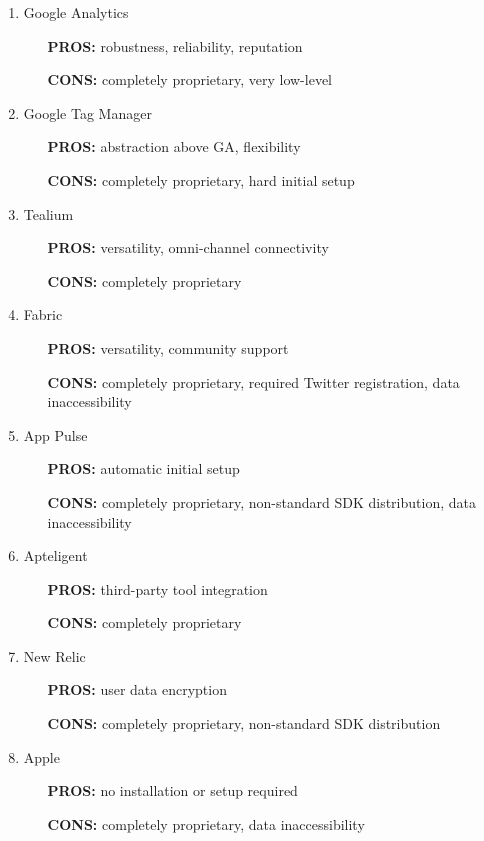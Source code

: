 \begin{enumerate}
	\item Google Analytics
		\begin{itemize}
			\item[{\bf PROS:}] robustness, reliability, reputation
			\item[{\bf CONS:}] completely proprietary, very low-level
		\end{itemize}
	\item Google Tag Manager
		\begin{itemize}
			\item[{\bf PROS:}] abstraction above GA, flexibility
			\item[{\bf CONS:}] completely proprietary, hard initial setup
		\end{itemize}
	\item Tealium
		\begin{itemize}
			\item[{\bf PROS:}] versatility, omni-channel connectivity
			\item[{\bf CONS:}] completely proprietary
		\end{itemize}
	\item Fabric
		\begin{itemize}
			\item[{\bf PROS:}] versatility, community support
			\item[{\bf CONS:}] completely proprietary, required Twitter registration, data inaccessibility
		\end{itemize}
	\item App Pulse
		\begin{itemize}
			\item[{\bf PROS:}] automatic initial setup
			\item[{\bf CONS:}] completely proprietary, non-standard SDK distribution, data inaccessibility
		\end{itemize}
	\item Apteligent
		\begin{itemize}
			\item[{\bf PROS:}] third-party tool integration
			\item[{\bf CONS:}] completely proprietary
		\end{itemize}
	\item New Relic
		\begin{itemize}
			\item[{\bf PROS:}] user data encryption
			\item[{\bf CONS:}] completely proprietary, non-standard SDK distribution
		\end{itemize}
	\item Apple
		\begin{itemize}
			\item[{\bf PROS:}] no installation or setup required
			\item[{\bf CONS:}] completely proprietary, data inaccessibility
		\end{itemize}
\end{enumerate}

